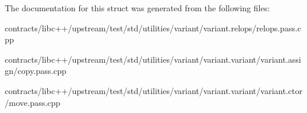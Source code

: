 The documentation for this struct was generated from the following files\+:\begin{DoxyCompactItemize}
\item 
contracts/libc++/upstream/test/std/utilities/variant/variant.\+relops/relops.\+pass.\+cpp\item 
contracts/libc++/upstream/test/std/utilities/variant/variant.\+variant/variant.\+assign/copy.\+pass.\+cpp\item 
contracts/libc++/upstream/test/std/utilities/variant/variant.\+variant/variant.\+ctor/move.\+pass.\+cpp\end{DoxyCompactItemize}
